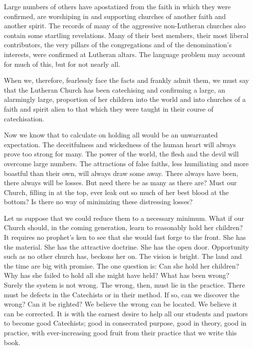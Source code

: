 Large numbers of others have apostatized from the faith in which they were confirmed, are worshiping in and supporting churches of another faith and another spirit. The records of many of the aggressive non-Lutheran churches also contain some startling revelations. Many of their best members, their most liberal contributors, the very pillars of the congregations and of the denomination’s interests, were confirmed at Lutheran altars. The language problem may account for much of this, but for not nearly all.

When we, therefore, fearlessly face the facts and frankly admit them, we must say that the Lutheran Church has been catechising and confirming a large, an alarmingly large, proportion of her children into the world and into churches of a faith and spirit alien to that which they were taught in their course of catechisation.

 Now we know that to calculate on holding all would be an unwarranted expectation. The deceitfulness and wickedness of the human heart will always prove too strong for many. The power of the world, the flesh and the devil will overcome large numbers. The attractions of false faiths, less humiliating and more boastful than their own, will always draw some away. There always have been,
there always will be losses. But need there be as many as there are? Must our Church, filling in at the top, ever leak out so much of her best blood at the bottom? Is there no way of minimizing these distressing losses?

Let us suppose that we could reduce them to a necessary minimum. What if our Church should, in the coming generation, learn to reasonably hold her children? It requires no prophet’s ken to see that she would fast forge to the front. She has the material. She has the attractive doctrine. She has the open door. Opportunity such as no other church has, beckons her on. The vision is bright. The land and the time are big with promise. The one question is: Can she hold her children? Why has she failed to hold all she might have held? What has been wrong? Surely the system is not wrong. The wrong, then, must lie in the practice. There must be defects in the Catechists or in their method. If so, can we discover the wrong? Can it be righted? We believe the wrong can be located. We believe it can be corrected. It is with the earnest desire to help all our students and pastors to become good Catechists; good in consecrated purpose, good in theory, good in practice, with ever-increasing good fruit from their practice that we write this book.


